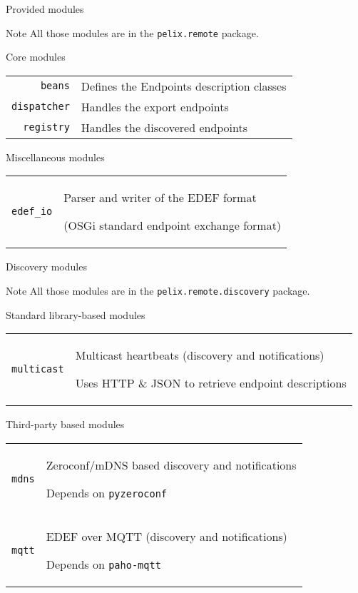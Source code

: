 \begin{frame}{Provided modules}
\begin{exampleblock}{Note}
All those modules are in the \texttt{pelix.remote} package.
\end{exampleblock}

\begin{block}{Core modules}
\begin{tabular}{rp{}}
\texttt{beans} & Defines the Endpoints description classes \\
\texttt{dispatcher} & Handles the export endpoints \\
\texttt{registry} & Handles the discovered endpoints \\
\end{tabular}
\end{block}

\begin{block}{Miscellaneous modules}
\begin{tabular}{rp{}}
\texttt{edef\_io} & Parser and writer of the EDEF format \par (OSGi standard endpoint exchange format) \\
\end{tabular}
\end{block}
\end{frame}


\begin{frame}{Discovery modules}
\begin{exampleblock}{Note}
All those modules are in the \texttt{pelix.remote.discovery} package.
\end{exampleblock}

\begin{block}{Standard library-based modules}
\begin{tabular}{rp{}}
\texttt{multicast} & Multicast heartbeats (discovery and notifications) \par Uses HTTP \& JSON to retrieve endpoint descriptions \\
\end{tabular}
\end{block}

\begin{block}{Third-party based modules}
\begin{tabular}{rp{}}
\texttt{mdns} & Zeroconf/mDNS based discovery and notifications \par Depends on \texttt{pyzeroconf} \\
\texttt{mqtt} & EDEF over MQTT (discovery and notifications) \par Depends on \texttt{paho-mqtt} \\
\end{tabular}
\end{block}
\end{frame}

